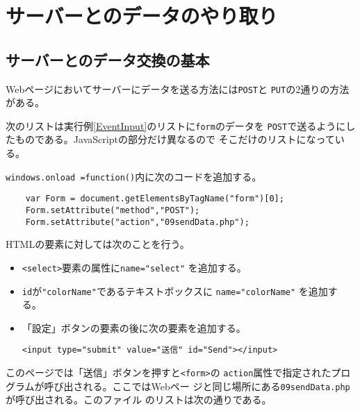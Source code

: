\section{サーバーとのデータのやり取り}

\subsection{サーバーとのデータ交換の基本}
Webページにおいてサーバーにデータを送る方法には\texttt{POST}と
\texttt{PUT}の2通りの方法がある。
\begin{Exec}\upshape
 次のリストは実行例\ref{EventInput}のリストに\texttt{form}のデータを
 \texttt{POST}で送るようにしたものである。JavaScriptの部分だけ異なるので
 そこだけのリストになっている。

\texttt{windows.onload =function()}内に次のコードを追加する。
\begin{verbatim}
    var Form = document.getElementsByTagName("form")[0];
    Form.setAttribute("method","POST");
    Form.setAttribute("action","09sendData.php");
\end{verbatim}
HTMLの要素に対しては次のことを行う。
\begin{itemize}
 \item \texttt{<select>}要素の属性に\verb+name="select"+ を追加する。
 \item \texttt{id}が\verb+"colorName"+であるテキストボックスに
       \verb+name="colorName"+ を追加する。
 \item 「設定」ボタンの要素の後に次の要素を追加する。
\begin{center}
\verb+<input type="submit" value="送信" id="Send"></input>+ 
\end{center}
\end{itemize}
このページでは「送信」ボタンを押すと\texttt{<form>}の
\texttt{action}属性で指定されたプログラムが呼び出される。ここではWebペー
 ジと同じ場所にある\texttt{09sendData.php}が呼び出される。このファイル
 のリストは次の通りである。

\end{Exec}